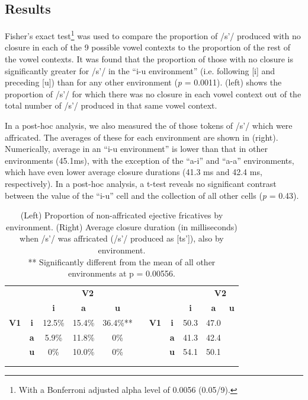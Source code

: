 \documentclass[output=paper
,newtxmath
,modfonts
,nonflat]{langsci/langscibook}
\begin{document}
\subsection{Results}\label{sec:moeng:5.3}

Fisher’s exact test\footnote{With a Bonferroni adjusted alpha level of 0.0056 (0.05/9).} was used to compare the proportion of /s’/ produced with no closure in each of the 9 possible vowel contexts to the proportion of the rest of the vowel contexts. It was found that the proportion of those with no closure is significantly greater for /s’/ in the “i-u environment” (i.e. following [i] and preceding [u]) than for any other environment (\textit{p} = 0.0011).  (left) shows the proportion of /s’/ for which there was no closure in each vowel context out of the total number of /s’/ produced in that same vowel context. 

In a post-hoc analysis, we also measured the  of those tokens of /s’/ which were affricated. The averages of these for each environment are shown in  (right). Numerically, average  in an “i-u environment” is lower than that in other environments (45.1ms), with the exception of the “a-i” and “a-a” environments, which have even lower average closure durations (41.3 ms and 42.4 ms, respectively). In a post-hoc analysis, a t-test reveals no significant contrast between the value of the “i-u” cell and the collection of all other cells (\textit{p} = 0.43).

\begin{table}
\begin{tabular}{ccccccccccc}
\lsptoprule
&  & \multicolumn{3}{c}{ \bfseries V2} &  &  &  & & \multicolumn{2}{c}{ \bfseries V2}\\
 &  & \bfseries i & \bfseries a & \bfseries u &  &  &  & \bfseries i & \bfseries a & \bfseries u\\
\midrule
\bfseries V1 & \bfseries i & 12.5\% & 15.4\% & 36.4\%** &  & \bfseries V1 & \bfseries i & 50.3 & 47.0 & \\
& \bfseries a & 5.9\% & 11.8\% & 0\% &  &  & \bfseries a & 41.3 & 42.4 & \\
& \bfseries u & 0\% & 10.0\% & 0\% &  &  & \bfseries u & 54.1 & 50.1 & \\
\\
\lspbottomrule
\end{tabular}
\caption{(Left) Proportion of non-affricated ejective fricatives by environment. (Right) Average closure duration (in milliseconds) when /s’/ was affricated (/s’/ produced as [ts’]), also by environment.\\
** Significantly different from the mean of all other environments at p = 0.00556.
}
\label{tab:moeng:2}
\end{table}
\end{document}

